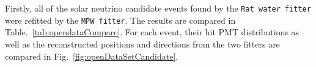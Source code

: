 Firstly, all of the solar neutrino candidate events found by the \texttt{Rat water fitter} were refitted by the \texttt{MPW fitter}. The results are compared in Table.~\ref{tab:opendataCompare}. For each event, their hit PMT distributions as well as the reconstructed positions and directions from the two fitters are compared in Fig.~\ref{fig:openDataSetCandidate}. 

\begin{figure}[htbp]
	\centering
\end{figure}

